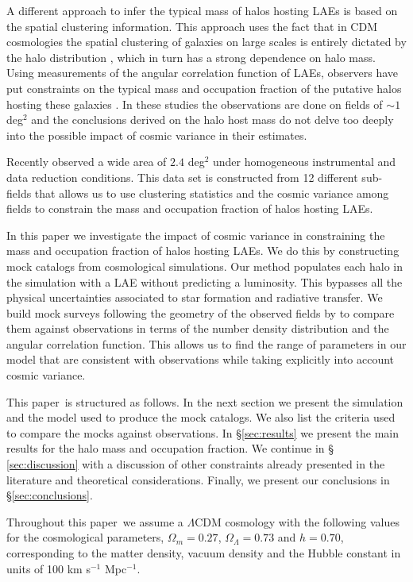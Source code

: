 \documentclass{emulateapj}
\newcommand{\documentname}{paper~}
\newcommand{\ly}{{\ifmmode{{\rm Ly}\alpha}\else{Ly$\alpha$~}\fi}}
\begin{document}
A different approach to infer the typical mass of halos hosting
LAEs is based on the spatial clustering information. This approach uses the fact
that in CDM cosmologies the spatial clustering of galaxies on large
scales is entirely dictated by the halo distribution
\citep{Colberg00}, which in turn has a strong dependence on halo
mass. Using measurements of the angular correlation function of LAEs,
observers have put constraints on the typical mass and occupation
fraction of the putative halos hosting these galaxies
\citep{Hayashino2004,Gawiser07,Nilsson2007,Ouchi2010}. In these
studies the observations are done on fields of $\sim 1$ deg$^{2}$ and
the conclusions derived on the halo host mass do not delve too deeply
into the possible impact of cosmic variance in their estimates.  

Recently \cite{Yamada2012} observed a wide area of $2.4$ deg$^{2}$
under homogeneous instrumental and data reduction conditions. This data
set is constructed from 12 different sub-fields that allows us to use
clustering statistics and the cosmic variance among fields to
constrain the mass and occupation fraction of halos hosting LAEs. 

In this paper we investigate the impact of cosmic variance in
constraining the mass and occupation fraction of halos hosting LAEs.
We do this by constructing mock catalogs from cosmological simulations.
Our method populates each halo in the simulation with a LAE without
predicting a \ly  luminosity. This bypasses all the physical
uncertainties associated to star formation and radiative transfer.
We build mock surveys following the geometry of the observed fields by
\cite{Yamada2012} to compare them  against observations in terms of
the number density distribution and the angular correlation
function. This allows us to find the range of parameters in our model
that are consistent with observations while taking explicitly into
account cosmic variance. 
  

This \documentname is structured as follows. In the next section we present
the simulation and the model used to produce the mock catalogs. We
also list the criteria used to compare the mocks against
observations. In \S \ref{sec:results} we present the main results for
the halo mass and occupation fraction. We continue in \S
\ref{sec:discussion} with a discussion of other constraints already
presented in the literature and theoretical considerations. Finally,
we present our conclusions in \S \ref{sec:conclusions}.

Throughout this \documentname we assume a $\Lambda$CDM cosmology with the
following values for the cosmological parameters, $\Omega_{m}=0.27$,
$\Omega_{\Lambda}=0.73$ and $h=0.70$, corresponding to the matter
density, vacuum density and the Hubble constant in units of 100 km
s$^{-1}$ Mpc$^{-1}$. 
\end{document}
